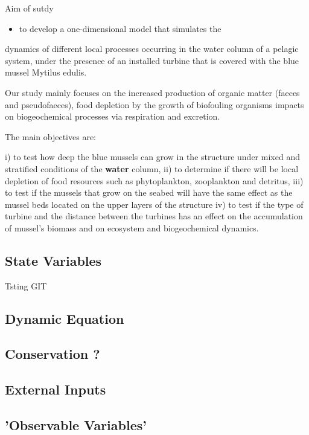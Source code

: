 \documentclass[final,xcolor=dvipsnames]{beamer}
\begin{document}
\begin{frame}
\begin{block}{Aim of sutdy}
\begin{itemize}
    \item to develop a one-dimensional model that simulates the
\end{itemize} 
dynamics of different local processes occurring in the water column of a pelagic
system, under the presence of an installed turbine that is covered with the blue
mussel Mytilus edulis.

Our study mainly focuses on
the increased production of organic matter (faeces and pseudofaeces),
food depletion by the growth of biofouling organisms
impacts on biogeochemical processes via respiration and excretion. 

The main objectives are: 

i) to test how deep the blue mussels can grow in the structure under mixed and stratified conditions of the \textbf<2>{water} column,
ii) to determine if there will be local depletion of food resources
such as phytoplankton, zooplankton and detritus,
iii) to test if the mussels that grow on the seabed will have the same effect as the mussel beds located on the upper layers of the structure iv) to test if the type of turbine and the distance between the turbines has an effect on the accumulation of mussel’s biomass and on ecosystem and biogeochemical dynamics.
\end{block}
\end{frame}



\subsection{State Variables}

\begin{frame}
 Tsting GIT
\end{frame}

\subsection{Dynamic Equation}
\subsection{Conservation ?}
\subsection{External Inputs}
\subsection{'Observable Variables'}
\end{document}
